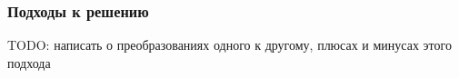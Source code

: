 \begin{frame}
\frametitle{Подходы к решению} %
TODO: написать о преобразованиях одного к другому, плюсах и минусах этого подхода
\end{frame}
